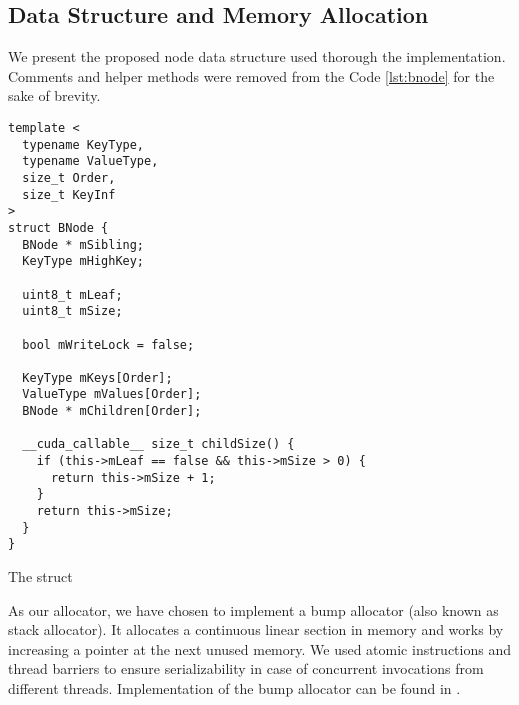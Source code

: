 \subsection{Data Structure and Memory Allocation}

We present the proposed node data structure used thorough the implementation. Comments and helper methods were removed from the Code \ref{lst:bnode} for the sake of brevity.

\begin{listing}[H]
  \begin{verbatim}
template <
  typename KeyType,
  typename ValueType,
  size_t Order,
  size_t KeyInf
>
struct BNode {
  BNode * mSibling;
  KeyType mHighKey;

  uint8_t mLeaf;
  uint8_t mSize;

  bool mWriteLock = false;

  KeyType mKeys[Order];
  ValueType mValues[Order];
  BNode * mChildren[Order]; 

  __cuda_callable__ size_t childSize() {
    if (this->mLeaf == false && this->mSize > 0) {
      return this->mSize + 1;
    }
    return this->mSize;
  }
}
    \end{verbatim}
  \caption{The  struct}\label{lst:bnode}
\end{listing}

As our allocator, we have chosen to implement a bump allocator (also known as stack allocator). It allocates a continuous linear section in memory and works by increasing a pointer at the next unused memory. We used atomic instructions and thread barriers to ensure serializability in case of concurrent invocations from different threads. Implementation of the bump allocator can be found in .

